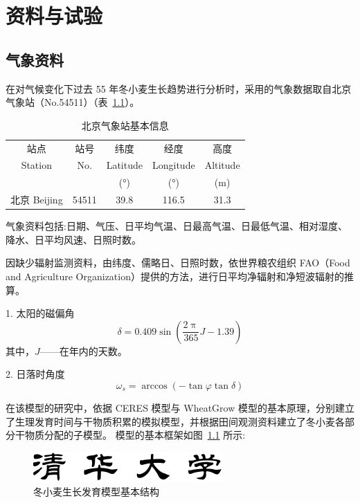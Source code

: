 \documentclass{thuthesis}
\begin{document}
\chapter{资料与试验}

\section{气象资料}

在对气候变化下过去 55 年冬小麦生长趋势进行分析时，采用的气象数据取自北京气象站（No.54511）（表~\ref{tab:beijing}）。

\begin{table}[htb]
  \centering
  \caption{北京气象站基本信息}
  \label{tab:beijing}
  \begin{tabular}{ccccc}
    \toprule
    站点 & 站号 & 纬度 & 经度 & 高度 \\
    Station & No. & Latitude & Longitude & Altitude \\
    && (°) & (°) & (m) \\
    \midrule
    北京 Beijing & 54511 & 39.8 & 116.5 & 31.3 \\
    \bottomrule
  \end{tabular}
\end{table}

气象资料包括:日期、气压、日平均气温、日最高气温、日最低气温、相对湿度、降水、日平均风速、日照时数。

因缺少辐射监测资料，由纬度、儒略日、日照时数，依世界粮农组织 FAO（Food and Agriculture Organization）提供的方法，进行日平均净辐射和净短波辐射的推算。

1. 太阳的磁偏角
\begin{equation}
  \delta = 0.409 \sin \left( \frac{2\uppi}{365} J - 1.39 \right)
\end{equation}
其中，$J$——在年内的天数。

2. 日落时角度
\begin{equation}
  \omega_s =\arccos\left( -\tan\varphi \tan\delta \right)
\end{equation}

\newpage

在该模型的研究中，依据 CERES 模型与 WheatGrow 模型的基本原理，分别建立了生理发育时间与干物质积累的模拟模型，并根据田间观测资料建立了冬小麦各部分干物质分配的子模型。
模型的基本框架如图~\ref{fig:winter} 所示:

\begin{figure}[htb]
  \centering
  \includegraphics{tsinghua.pdf}
  \caption{冬小麦生长发育模型基本结构}
  \label{fig:winter}
\end{figure}
\end{document}
